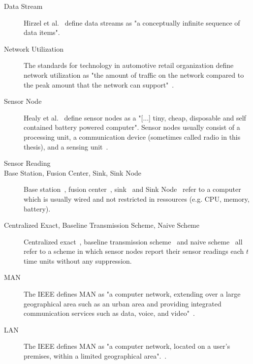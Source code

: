 \begin{description}

    \item[Data Stream]
        Hirzel et al.~\cite{hirzel2014catalog} define data streams as "a
        conceptually infinite sequence of data items".

    \item[Network Utilization]
        The standards for technology in automotive retail organization define
        network utilization as "the amount of traffic on the network compared
        to the peak amount that the network can support"~\cite{networkutil}.

    \item[Sensor Node]
        Healy et al.~\cite{healy2008wireless} define sensor nodes as a "[...]
        tiny, cheap, disposable and self contained battery powered computer".
        Sensor nodes usually consist of a processing unit, a communication
        device (sometimes called radio in this thesis), and a sensing
        unit~\cite{akyildiz2002wireless}.

    \item[Sensor Reading]
        

    \item[Base Station, Fusion Center, Sink, Sink Node]
        Base station~\cite{padhy2006utility}, fusion
        center~\cite{willett2004backcasting}, sink~\cite{alippi2009energy} and
        Sink Node~\cite{chen2013sink} refer to a computer which is usually
        wired and not restricted in ressources (e.g. CPU, memory, battery).

    \item[Centralized Exact, Baseline Transmission Scheme, Naive Scheme]
        Centralized exact~\cite{gedik2007asap}, baseline transmission
        scheme~\cite{luo2009compressive} and naive
        scheme~\cite{cheng2010efficient} all refer to a scheme in which sensor
        nodes report their sensor readings each $ t $ time units without any
        suppression.

    \item[\ac{MAN}]
        The \ac{IEEE} defines \ac{MAN} as "a computer network, extending over a
        large geographical area such as an urban area and providing integrated
        communication services such as data, voice, and video"~\cite{ieee802}.

    \item[\ac{LAN}]
        The \ac{IEEE} defines \ac{MAN} as "a computer network, located on a
        user’s premises, within a limited geographical area".~\cite{ieee802}.


\end{description}
